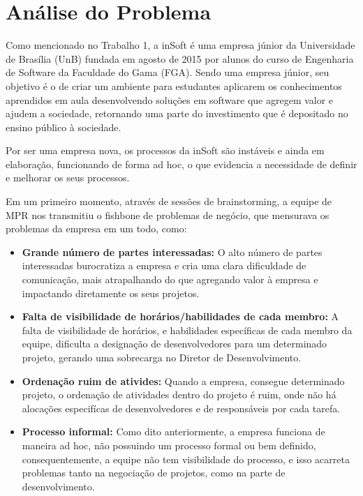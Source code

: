 \section{Análise do Problema}
\label{sec:prob}

Como mencionado no Trabalho 1, a inSoft é uma empresa júnior da Universidade de Brasília (UnB) fundada em agosto de 2015 por alunos do curso de Engenharia de Software da Faculdade do Gama (FGA). Sendo uma empresa júnior, seu objetivo é o de criar um ambiente para estudantes aplicarem os conhecimentos aprendidos em aula desenvolvendo soluções em software que agregem valor e ajudem a sociedade, retornando uma parte do investimento que é depositado no ensino público à sociedade.

Por ser uma empresa nova, os processos da inSoft são instáveis e ainda em elaboração, funcionando de forma ad hoc, o que evidencia a necessidade de definir e melhorar os seus processos.

Em um primeiro momento, através de sessões de brainstorming, a equipe de MPR nos transmitiu o fishbone de problemas de negócio, que mensurava os problemas da empresa em um todo, como:

\begin{itemize}
  \item \textbf{Grande número de partes interessadas:}
  O alto número de partes interessadas burocratiza a empresa e cria uma clara dificuldade de comunicação, mais atrapalhando do que agregando valor à empresa e impactando diretamente os seus projetos.
\end{itemize}


\begin{itemize}
  \item \textbf{Falta de visibilidade de horários/habilidades de cada membro:}
  A falta de visibilidade de horários, e habilidades específicas de cada membro da equipe, dificulta a designação de desenvolvedores para um determinado projeto, gerando uma sobrecarga no Diretor de Desenvolvimento.
\end{itemize}

\begin{itemize}
  \item \textbf{Ordenação ruim de ativides:}
  Quando a empresa, consegue determinado projeto, o ordenação de atividades dentro do projeto é ruim, onde não há alocações especifícas de desenvolvedores e de responsáveis por cada tarefa.
\end{itemize}

\begin{itemize}
  \item \textbf{Processo informal:}
  Como dito anteriormente, a empresa funciona de maneira ad hoc, não possuindo um processo formal ou bem definido, consequentemente, a equipe não tem visibilidade do processo, e isso acarreta problemas tanto na negociação de projetos, como na parte de desenvolvimento.
\end{itemize}

